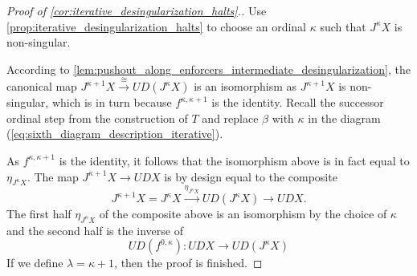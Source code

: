 \begin{proof}[Proof of \cref{cor:iterative_desingularization_halts}.]
Use \cref{prop:iterative_desingularization_halts} to choose an ordinal $\kappa$ such that $J^\kappa X$ is non-singular.

According to \cref{lem:pushout_along_enforcers_intermediate_desingularization}, the canonical map $J^{\kappa +1}X\xrightarrow{\cong } UD(J^\kappa X)$ is an isomorphism as $J^{\kappa +1}X$ is non-singular, which is in turn because $f^{\kappa ,\kappa +1}$ is the identity. Recall the successor ordinal step from the construction of $T$ and replace $\beta$ with $\kappa$ in the diagram (\ref{eq:sixth_diagram_description_iterative}).

As $f^{\kappa ,\kappa +1}$ is the identity, it follows that the isomorphism above is in fact equal to $\eta _{J^\kappa X}$. The map $J^{\kappa +1}X\to UDX$ is by design equal to the composite
\[J^{\kappa +1}X=J^\kappa X\xrightarrow{\eta _{J^\kappa X}} UD(J^\kappa X)\to UDX.\]
The first half $\eta _{J^\kappa X}$ of the composite above is an isomorphism by the choice of $\kappa$ and the second half is the inverse of
\[UD(f^{0,\kappa }):UDX\to UD(J^\kappa X)\]
If we define $\lambda =\kappa +1$, then the proof is finished.
\end{proof}
